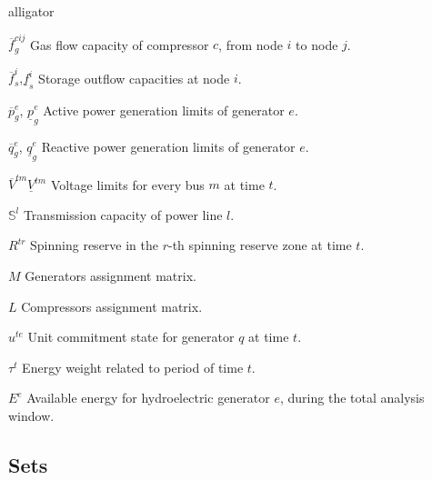 \begin{labeling}{alligator}
\item [$\overline{f}^{cij}_{g}$] Gas flow capacity of compressor $c$, from node $i$ to node $j$.
\item [$\overline{f}^{i}_{s}$,$\underline{f}^{i}_{s}$] Storage outflow capacities at node $i$.
\item [$\overline{p}_{g}^{e}$, $\underline{p}_{g}^{e}$] Active power generation limits of generator $e$.
\item [$\overline{q}_{g}^{e}$, $\underline{q}_{g}^{e}$] Reactive power generation limits of generator $e$.
\item [$\overline{V}^{tm} \underline{V}^{tm}$] Voltage limits for every bus $m$ at time $t$.
\item [$\mathbb{S}^{l}$] Transmission capacity of power line $l$.
\item [$R^{tr}$]  Spinning reserve in the $r$-th spinning reserve zone at time $t$.
\item [$M$] Generators assignment matrix.
\item [$L$] Compressors assignment matrix.
\item [$u^{te}$] Unit commitment state for generator $q$ at time $t$.
\item [$\tau^{t}$] Energy weight related to period of time $t$.
\item [$E^{e}$] Available energy for hydroelectric generator $e$, \break during the total analysis window.

\end{labeling}

\subsection*{Sets}

